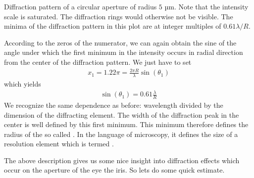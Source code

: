 \documentclass[letterpaper,10pt,english]{sphinxmanual}
\begin{document}



 Diffraction pattern of a circular aperture of radius \(5\) µm. Note that the intensity scale is saturated. The diffraction rings would otherwise not be visible. The minima of the diffraction pattern in this plot are at integer multiples of \(0.61\lambda/R\).





According to the zeros of the numerator, we can again obtain the sine of the angle under which the first minimum in the intensity occurs in radial direction from the center of the diffraction pattern. We just have to set
\begin{equation*}
\begin{split}x_1=1.22\pi=\frac{2\pi R}{\lambda}\sin(\theta_1)\end{split}
\end{equation*}
which yields
\begin{equation*}
\begin{split}\sin(\theta_1)=0.61\frac{\lambda}{R}\end{split}
\end{equation*}
We recognize the same dependence as before: wavelength divided by the dimension of the diffracting element. The width of the diffraction peak in the center is well defined by this first minimum. This minimum therefore defines the radius of the so called . In the language of microscopy, it defines the size of a resolution element which is termed .


The above description gives us some nice insight into diffraction effects which occur on the aperture of the eye \sphinxhyphen{} the iris. So lets do some quick estimate.
\end{document}
